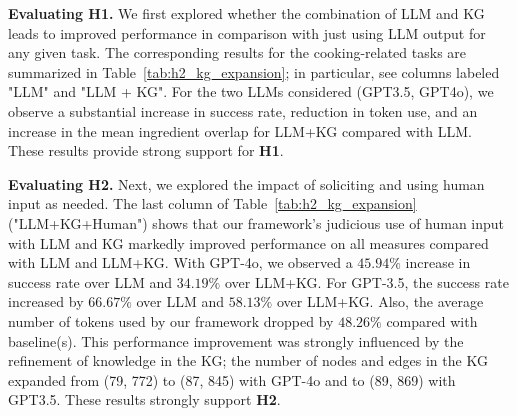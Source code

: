 \vspace{-0.5em}
\noindent
\textbf{Evaluating H1.} 
We first explored whether the combination of LLM and KG leads to improved performance in comparison with just using LLM output for any given task. The corresponding results for the cooking-related tasks are summarized in Table~\ref{tab:h2_kg_expansion}; in particular, see columns labeled "LLM" and "LLM + KG". For the two LLMs considered (GPT3.5, GPT4o), we observe a substantial increase in success rate, reduction in token use, and an increase in the mean ingredient overlap for LLM+KG compared with LLM. These results provide strong support for \textbf{H1}.



\vspace{-0.5em}
\noindent
\textbf{Evaluating H2.}
Next, we explored the impact of soliciting and using human input as needed. The last column of Table~\ref{tab:h2_kg_expansion} ("LLM+KG+Human") shows that our framework's judicious use of human input with LLM and KG markedly improved performance on all measures compared with LLM and LLM+KG. With GPT-4o, we observed a $45.94\%$ increase in success rate over LLM and $34.19\%$ over LLM+KG. For GPT-3.5, the success rate increased by $66.67\%$ over LLM and $58.13\%$ over LLM+KG. Also, the average number of tokens used by our framework dropped by $48.26\%$ compared with baseline(s). This performance improvement was strongly influenced by the refinement of knowledge in the KG; the number of nodes and edges in the KG expanded from (79, 772) to (87, 845) with GPT-4o and to (89, 869) with GPT3.5. These results strongly support \textbf{H2}.


